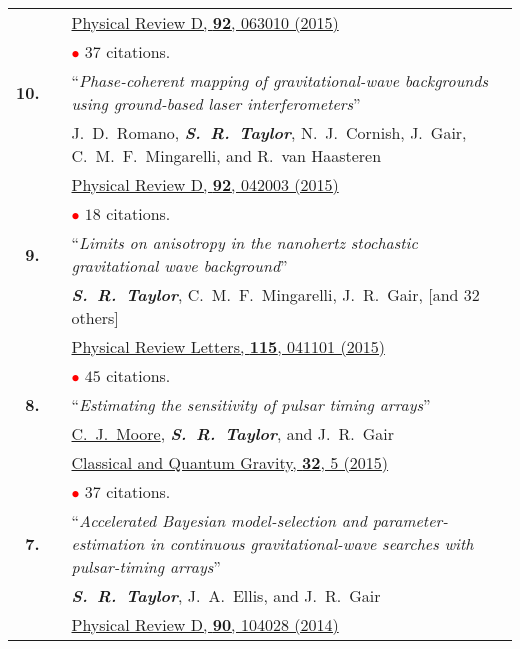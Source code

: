 \documentclass[11pt,letterpaper,sans]{moderncv}
\begin{document}
{\begin{longtable}{rp{0.3cm}p{15.8cm}}
&& \href{http://journals.aps.org/prd/abstract/10.1103/PhysRevD.92.063010}{{\color{color1} Physical Review D, \textbf{92}, 063010 (2015)}} \\
&& \textcolor{red}{$\bullet$} $37$ citations. \vspace{0.09cm}\\
\textbf{10.} & & ``\textit{Phase-coherent mapping of gravitational-wave backgrounds using ground-based laser interferometers}'' \\ 
&& J.~D.~Romano, \textit{\textbf{S.~R.~Taylor}}, N.~J.~Cornish, J.~Gair, C.~M.~F.~Mingarelli, and R.~van Haasteren \\ 
&& \href{http://journals.aps.org/prd/abstract/10.1103/PhysRevD.92.042003}{{\color{color1} Physical Review D, \textbf{92}, 042003 (2015)}} \\
&& \textcolor{red}{$\bullet$} $18$ citations. \vspace{0.09cm}\\
\textbf{9.} & & ``\textit{Limits on anisotropy in the nanohertz stochastic gravitational wave background}'' \\ 
&& \textit{\textbf{S.~R.~Taylor}}, C.~M.~F.~Mingarelli, J.~R.~Gair, [and 32 others] \\ 
&& \href{http://journals.aps.org/prl/abstract/10.1103/PhysRevLett.115.041101}{{\color{color1} Physical Review Letters, \textbf{115}, 041101 (2015)}} \\
&& \textcolor{red}{$\bullet$} $45$ citations. \vspace{0.09cm}\\
\textbf{8.} & & ``\textit{Estimating the sensitivity of pulsar timing arrays}'' \\ 
&& \underline{C.~J.~Moore}, \textit{\textbf{S.~R.~Taylor}}, and J.~R.~Gair \\ 
&& \href{http://iopscience.iop.org/article/10.1088/0264-9381/32/5/055004/meta}{{\color{color1} Classical and Quantum Gravity, \textbf{32}, 5 (2015)}} \\
&& \textcolor{red}{$\bullet$} $37$ citations. \vspace{0.09cm}\\
\textbf{7.} & & ``\textit{Accelerated Bayesian model-selection and parameter-estimation in continuous gravitational-wave searches with pulsar-timing arrays}'' \\ 
&& \textit{\textbf{S.~R.~Taylor}}, J.~A.~Ellis, and J.~R.~Gair \\ 
&& \href{http://journals.aps.org/prd/abstract/10.1103/PhysRevD.90.104028}{{\color{color1} Physical Review D, \textbf{90}, 104028 (2014)}} \\

\end{longtable}}
\end{document}
